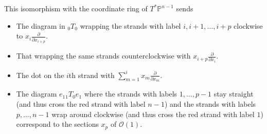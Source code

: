 This isomorphism with the coordinate ring of $T^*\mathbb{P}^{n-1}$ sends
  \begin{itemize}
  \item The diagram in ${}_{0}T_{0}$ wrapping the strands with label
    $i, i+1,\dots, i+p$ clockwise to
    $x_i\frac{\partial}{\partial x_{i+p}}$.
  \item That wrapping the same strands counterclockwise with
    $x_{i+p}\frac{\partial}{\partial x_{i}}$.
  \item The dot on the $i$th strand with
    $\sum_{m=1}^{i}x_{m}\frac{\partial}{\partial x_{m}}$.
  \item The diagram $e_1{}_{1}T_{0}e_1$ where the strands with labels
    $1,\dots, p-1$ stay straight (and thus cross the red strand with
    label $n-1$) and the strands with labels $p,\dots, n-1$ wrap
    around clockwise (and thus cross the red strand with label $1$)
    correspond to the sections $x_p$ of $\mathcal{O}(1)$.
  \end{itemize}
